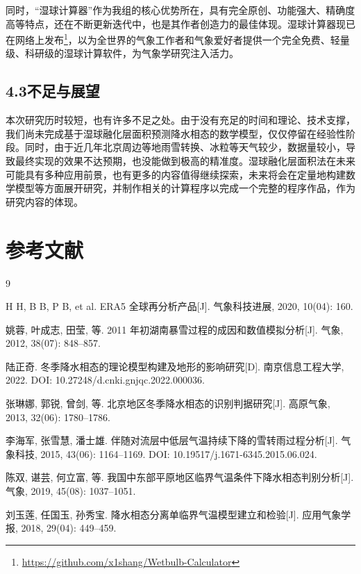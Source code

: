 同时，“湿球计算器”作为我组的核心优势所在，具有完全原创、功能强大、精确度高等特点，还在不断更新迭代中，也是其作者创造力的最佳体现。湿球计算器现已在网络上发布\footnote{\url{https://github.com/x1shang/Wetbulb-Calculator}}，以为全世界的气象工作者和气象爱好者提供一个完全免费、轻量级、科研级的湿球计算软件，为气象学研究注入活力。

\subsection*{4.3\quad 不足与展望}

本次研究历时较短，也有许多不足之处。由于没有充足的时间和理论、技术支撑，我们尚未完成基于湿球融化层面积预测降水相态的数学模型，仅仅停留在经验性阶段。同时，由于近几年北京周边等地雨雪转换、冰粒等天气较少，数据量较小，导致最终实现的效果不达预期，也没能做到极高的精准度。湿球融化层面积法在未来可能具有多种应用前景，也有更多的内容值得继续探索，未来将会在定量地构建数学模型等方面展开研究，并制作相关的计算程序以完成一个完整的程序作品，作为研究内容的体现。

\section*{参考文献}

\begin{thebibliography}{9}

 H H, B B, P B, et al. ERA5 全球再分析产品[J]. 气象科技进展, 2020, 10(04): 160.

 姚蓉, 叶成志, 田莹, 等. 2011 年初湖南暴雪过程的成因和数值模拟分析[J]. 气象, 2012, 38(07): 848--857.

 陆正奇. 冬季降水相态的理论模型构建及地形的影响研究[D]. 南京信息工程大学, 2022. DOI: 10.27248/d.cnki.gnjqc.2022.000036.

 张琳娜, 郭锐, 曾剑, 等. 北京地区冬季降水相态的识别判据研究[J]. 高原气象, 2013, 32(06): 1780--1786.

 李海军, 张雪慧, 潘士雄. 伴随对流层中低层气温持续下降的雪转雨过程分析[J]. 气象科技, 2015, 43(06): 1164--1169. DOI: 10.19517/j.1671-6345.2015.06.024.

 陈双, 谌芸, 何立富, 等. 我国中东部平原地区临界气温条件下降水相态判别分析[J]. 气象, 2019, 45(08): 1037--1051.

 刘玉莲, 任国玉, 孙秀宝. 降水相态分离单临界气温模型建立和检验[J]. 应用气象学报, 2018, 29(04): 449--459.

\end{thebibliography}
